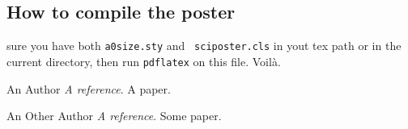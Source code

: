 \documentclass[landscape, a2]{sciposter}
\begin{document}
\begin{multicols}{3}
\section{How to compile the poster}
 sure you have both {\tt a0size.sty} and {\tt
sciposter.cls} in yout tex path or in the \cite{somepaper} current
directory, then run {\tt pdflatex} on this file. Voil\`a.


\begin{thebibliography}{m}

An Author
{\em A reference}.
A paper.

An Other Author
{\em A reference}.
Some paper.


\end{thebibliography}


\end{multicols}
\end{document}

